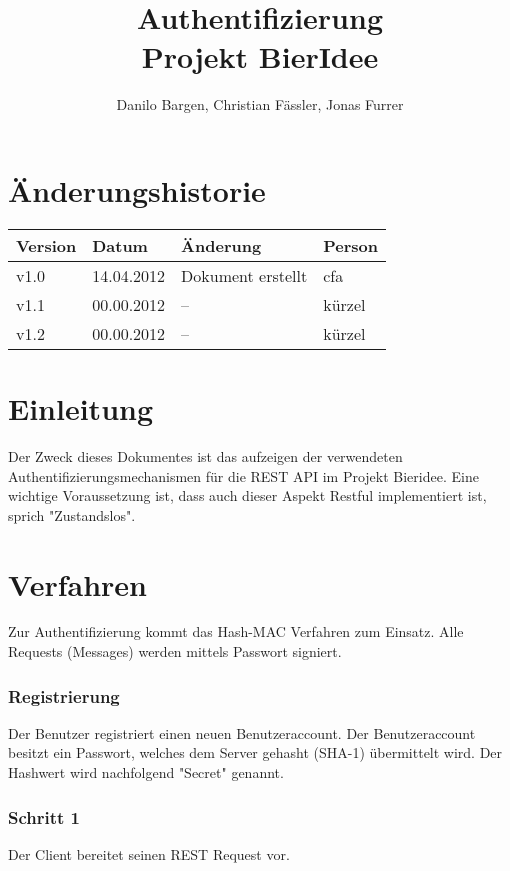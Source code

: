 \documentclass[10pt,a4paper]{scrartcl}
\author{Danilo Bargen, Christian Fässler, Jonas Furrer}
\title{Authentifizierung\\ Projekt BierIdee}
\begin{document}
\begin{titlepage}
	\maketitle
	\vspace{120mm}
	\thispagestyle{empty} %
\end{titlepage}

\tableofcontents
\newpage

\section*{Änderungshistorie}
\begin{tabular}{p{}p{}p{}p{}}
\toprule
\textbf{Version} & \textbf{Datum} & \textbf{Änderung} & \textbf{Person} \\  
\midrule
v1.0 & 14.04.2012 & Dokument erstellt & cfa \\  
\hline 
v1.1 & 00.00.2012 & -- & kürzel \\
\hline 
v1.2 & 00.00.2012 & -- & kürzel \\
\bottomrule
\end{tabular} 
\newpage

\section{Einleitung}
Der Zweck dieses Dokumentes ist das aufzeigen der verwendeten Authentifizierungsmechanismen für die REST API im Projekt Bieridee. Eine wichtige Voraussetzung ist, dass auch dieser Aspekt Restful implementiert ist, sprich "Zustandslos".
\section{Verfahren}
Zur Authentifizierung kommt das Hash-MAC Verfahren zum Einsatz. Alle Requests (Messages) werden mittels Passwort signiert.
\subsubsection{Registrierung}
Der Benutzer registriert einen neuen Benutzeraccount.
Der Benutzeraccount besitzt ein Passwort, welches dem Server gehasht (SHA-1) übermittelt wird.
Der Hashwert wird nachfolgend "Secret" genannt. 
\subsubsection{Schritt 1}
Der Client bereitet seinen REST Request vor. 
\end{document}
